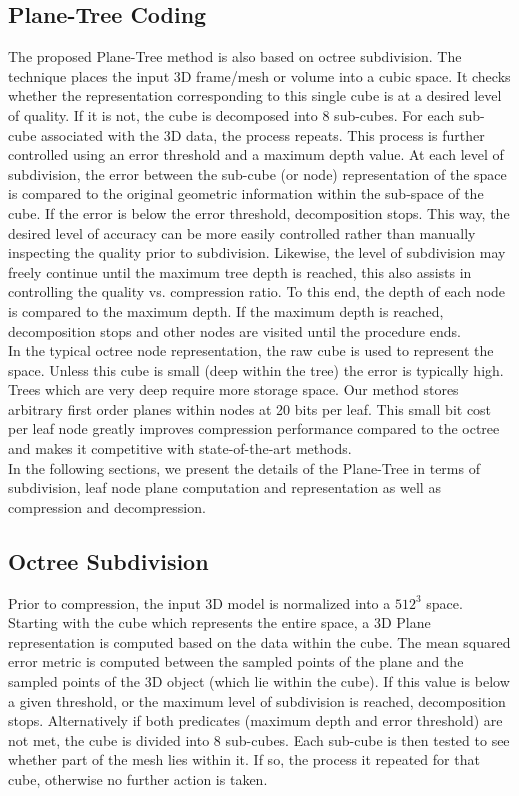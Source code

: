 \subsection{Plane-Tree Coding}

The proposed Plane-Tree method is also based on octree subdivision. The technique places the input 3D frame/mesh or volume into a cubic space. It checks whether the representation corresponding to this single cube is at a desired level of quality. If it is not, the cube is decomposed into 8 sub-cubes. For each sub-cube associated with the 3D data, the process repeats. This process is further controlled using an error threshold and a maximum depth value. At each level of subdivision, the error between the sub-cube (or node) representation of the space is compared to the original geometric information within the sub-space of the cube. If the error is below the error threshold, decomposition stops. This way, the desired level of accuracy can be more easily controlled rather than manually inspecting the quality prior to subdivision. Likewise, the level of subdivision may freely continue until the maximum tree depth is reached, this also assists in controlling the quality vs. compression ratio. To this end, the depth of each node is compared to the maximum depth. If the maximum depth is reached, decomposition stops and other nodes are visited until the procedure ends. \\

In the typical octree node representation, the raw cube is used to represent the space. Unless this cube is small (deep within the tree) the error is typically high. Trees which are very deep require more storage space. Our method stores arbitrary first order planes within nodes at 20 bits per leaf. This small bit cost per leaf node greatly improves compression performance compared to the octree and makes it competitive with state-of-the-art methods. \\

 
In the following sections, we present the details of the Plane-Tree in terms of subdivision, leaf node plane computation and representation as well as compression and decompression. \\


\subsection{Octree Subdivision}

Prior to compression, the input 3D model is normalized into a $512^3$ space. Starting with the cube which represents the entire space, a 3D Plane representation is computed based on the data within the cube. The mean squared error metric is computed between the sampled points of the plane and the sampled points of the 3D object (which lie within the cube). If this value is below a given threshold, or the maximum level of subdivision is reached, decomposition stops. Alternatively if both predicates (maximum depth and error threshold) are not met, the cube is divided into 8 sub-cubes. Each sub-cube is then tested to see whether part of the mesh lies within it. If so, the process it repeated for that cube, otherwise no further action is taken. \\

